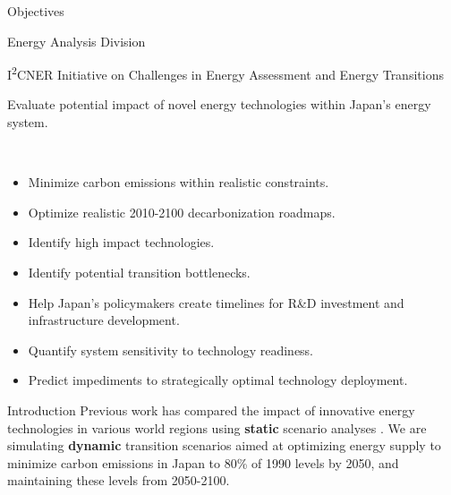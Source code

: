\documentclass[final]{beamer}
\newlength{\onecolwid}
\newlength{\twocolwid}
\newlength{\threecolwid}
\begin{document}
\begin{frame}[t]
\begin{columns}[t,totalwidth=\threecolwid]
\begin{column}{\twocolwid}
\begin{columns}[t,totalwidth=\twocolwid]
\begin{column}{\onecolwid}
\begin{alertblock}{Objectives}
\begin{description}
{\large 
        \item[\textbf{Division:}] Energy Analysis Division
        \item[\textbf{Project:}] I\textsuperscript{2}CNER Initiative on Challenges in Energy Assessment and Energy Transitions
        \item[\textbf{Objective:}] Evaluate potential impact of novel energy technologies within Japan's energy system.
\item[\textbf{Milestones:}] ~\\}
        \begin{itemize}
        \item Minimize carbon emissions within realistic constraints.
        \item Optimize realistic 2010-2100 decarbonization roadmaps.
	\item Identify high impact technologies.
        \item Identify potential transition bottlenecks.
        \item Help Japan's policymakers create timelines for R\&D investment and infrastructure development.
        \item Quantify system sensitivity to technology readiness.
	\item Predict impediments to strategically optimal technology deployment.
	\end{itemize}
\end{description}

\end{alertblock}
%
%


\begin{block}{Introduction}
Previous work has compared the impact of innovative energy technologies in 
various world regions using \textbf{static} scenario analyses 
\cite{kikuchi_simulation-based_2017,pambudi_impact_2017}.  
We are simulating \textbf{dynamic} transition scenarios 
\cite{pfenninger_energy_2014} aimed at optimizing energy supply to minimize carbon 
emissions in Japan to 80\% of 1990 levels by 2050, and maintaining these levels from 2050-2100. \\


\end{block}
\end{column}
\end{columns}
\end{column}
\end{columns}
\end{frame}
\end{document}
